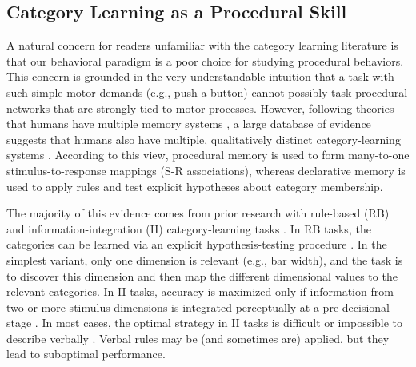 \subsection*{Category Learning as a Procedural Skill}
A natural concern for readers unfamiliar with the category learning literature
is that our behavioral paradigm is a poor choice for studying procedural
behaviors. This concern is grounded in the very understandable intuition that a
task with such simple motor demands (e.g., push a button) cannot possibly task
procedural networks that are strongly tied to motor processes. However,
following theories that humans have multiple memory systems
\cite{EichenbaumCohen2001, Squire2004, Tulving2000}, a large database of
evidence suggests that humans also have multiple, qualitatively distinct
category-learning systems \cite{AshbyCOVIS1998, EricksonKruschke1998}. According
to this view, procedural memory is used to form many-to-one stimulus-to-response
mappings (S-R associations), whereas declarative memory is used to apply rules
and test explicit hypotheses about category membership.

The majority of this evidence comes from prior research with rule-based (RB) and
information-integration (II) category-learning tasks \cite{HelieRoederAshby2010,
NomuraEtAl2007, SotoEtAl2013, WaldschmidtAshby2011}. In RB tasks, the categories
can be learned via an explicit hypothesis-testing procedure
\cite{AshbyCOVIS1998}. In the simplest variant, only one dimension is relevant
(e.g., bar width), and the task is to discover this dimension and then map the
different dimensional values to the relevant categories. In II tasks, accuracy
is maximized only if information from two or more stimulus dimensions is
integrated perceptually at a pre-decisional stage \cite{AshbyGott1988}. In most
cases, the optimal strategy in II tasks is difficult or impossible to describe
verbally \cite{AshbyCOVIS1998}. Verbal rules may be (and sometimes are) applied,
but they lead to suboptimal performance.

